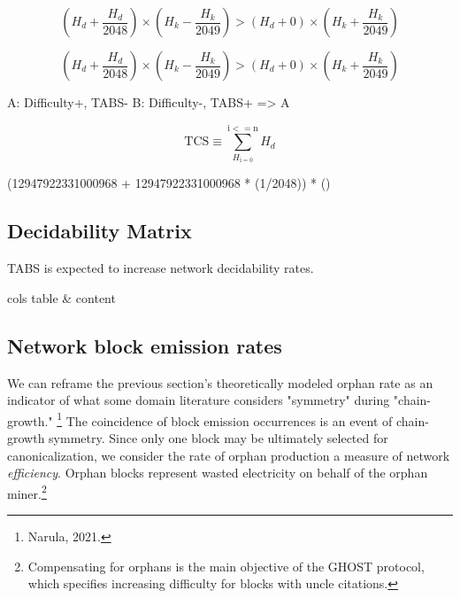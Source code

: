 \documentclass[11pt]{article}
\theoremstyle{plain}
\begin{document}
{\begin{equation}
    (H_d + \frac{H_d}{2048}) \times (H_k - \frac{H_k}{2049}) > (H_d + 0) \times (H_k + \frac{H_k}{2049})
\end{equation}

\begin{equation}
(H_d + \frac{H_d}{2048}) \times (H_k - \frac{H_k}{2049}) > (H_d + 0) \times (H_k + \frac{H_k}{2049})
\end{equation}


A: Difficulty+, TABS-
B: Difficulty-, TABS+
=> A



\begin{equation}
    \mathrm{TCS} \equiv \sum_{H_\mathrm{i = 0}}^{\mathrm{i <= n}} H_d
\end{equation}


(12947922331000968 + 12947922331000968 * (1/2048)) * ()

\subsection{\normalsize{Decidability Matrix}}

TABS is expected to increase network decidability rates.

\begin{tabular}[pos]{cols}
    table & content
\end{tabular}


\subsection{\normalsize{Network block emission rates}}

We can reframe the previous section's theoretically modeled orphan rate
as an indicator of what some domain literature considers "symmetry" during "chain-growth."\nolinebreak
\footnote{Narula, 2021.}
The coincidence of block emission occurrences is an event of chain-growth symmetry.
Since only one block may be ultimately selected for canonicalization, we consider the rate of orphan production
a measure of network \emph{efficiency}.
Orphan blocks represent wasted electricity on behalf of the orphan miner.\footnote{
    Compensating for orphans is the main objective of the GHOST protocol,
    which specifies increasing difficulty for blocks with uncle citations.
}

}
\end{document}
